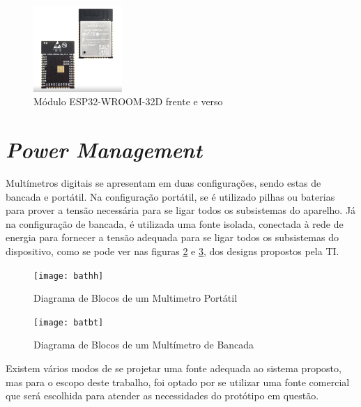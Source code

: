 \begin{figure}[htb!]
    \caption{Módulo ESP32-WROOM-32D frente e verso}
    \label{fig:esp32-frente-verso}
    \includegraphics[width=0.3\textwidth]{figuras/esp32-frente-verso.png}
\end{figure}

\section{\textit{Power Management}}\label{powerManagement}

Multímetros digitais se apresentam em duas configurações, sendo estas de bancada e portátil. Na configuração portátil, se é utilizado pilhas ou baterias para prover a tensão necessária para se ligar todos os subsistemas do aparelho. Já na configuração de bancada, é utilizada uma fonte isolada, conectada à rede de energia para fornecer a tensão adequada para se ligar todos os subsistemas do dispositivo, como se pode ver nas figuras \ref{fig:bathh} e \ref{fig:batbt}, dos designs propostos pela \gls{TI}.

\begin{figure}[htb!]%
    \caption{Diagrama de Blocos de um Multimetro Portátil}%
    \label{fig:bathh}%
    \texttt{[image: bathh]}%
\end{figure}

\begin{figure}[htb!]%
    \caption{Diagrama de Blocos de um Multímetro de Bancada}%
    \label{fig:batbt}%
    \texttt{[image: batbt]}%
\end{figure}

Existem vários modos de se projetar uma fonte adequada ao sistema proposto, mas para o escopo deste trabalho, foi optado por se utilizar uma fonte comercial que será escolhida para atender as necessidades do protótipo em questão.

